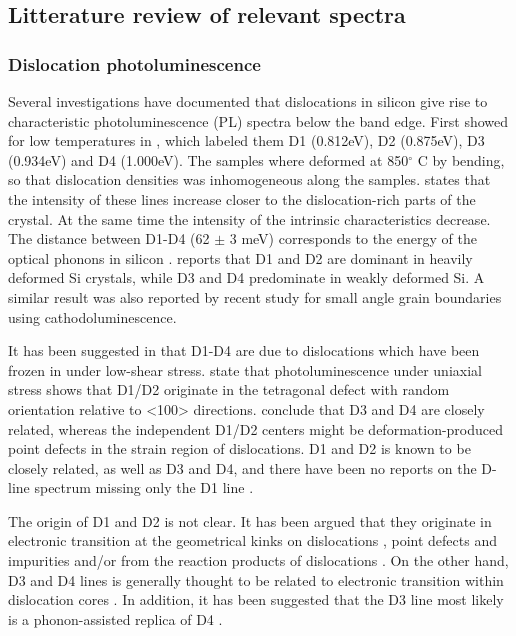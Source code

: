 \subsection{Litterature review of relevant spectra}

\subsubsection{Dislocation photoluminescence}

Several investigations have documented that dislocations in silicon give rise to characteristic photoluminescence (PL) spectra below the band edge. First showed for low temperatures in \cite{drozdov76}, which labeled them D1 (0.812eV), D2 (0.875eV), D3 (0.934eV) and D4 (1.000eV). The samples where deformed at 850$^\circ$ C by bending, so that dislocation densities was inhomogeneous along the samples. \cite{drozdov76} states that the intensity of these lines increase closer to the dislocation-rich parts of the crystal. At the same time the intensity of the intrinsic characteristics decrease. The distance between D1-D4 (62 $\pm$ 3 meV) corresponds to the energy of the optical phonons in silicon \cite{drozdov76}. \cite{drozdov76} reports that D1 and D2 are dominant in heavily deformed Si crystals, while D3 and D4 predominate in weakly deformed Si. A similar result was also reported by recent study \cite{lee09} for small angle grain boundaries using cathodoluminescence.

It has been suggested in \cite{sauer85} that D1-D4 are due to dislocations which have been frozen in under low-shear stress. \cite{sauer85} state that photoluminescence under uniaxial stress shows that D1/D2 originate in the tetragonal defect with random orientation relative to <100> directions. \cite{sauer85} conclude that D3 and D4 are closely related, whereas the independent D1/D2 centers might be deformation-produced point defects in the strain region of dislocations. D1 and D2 is known to be closely related, as well as D3 and D4, and there have been no reports on the D-line spectrum missing only the D1 line \cite{sugimoto06}.

The origin of D1 and D2 is not clear. It has been argued that they originate in electronic transition at the geometrical kinks on dislocations \cite{suezawa83}, point defects \cite{sauer85} and impurities \cite{higgs91} and/or from the reaction products of dislocations \cite{sekiguchi95}. On the other hand, D3 and D4 lines is generally thought to be related to electronic transition within dislocation cores \cite{kveder95}. In addition, it has been suggested that the D3 line most likely is a phonon-assisted replica of D4 \cite{kveder95}.

